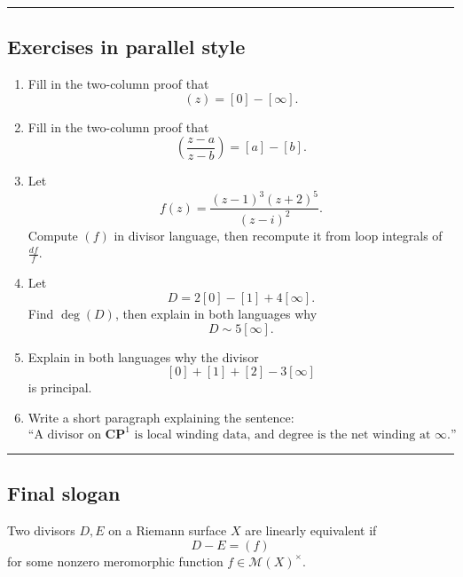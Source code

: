 \documentclass[11pt]{article}
\begin{document}
	\bigskip
	\hrule
	\bigskip
	
	\subsection*{Exercises in parallel style}
	
	\begin{enumerate}
		\item Fill in the two-column proof that
		\[
		(z)=[0]-[\infty].
		\]
		
		\item Fill in the two-column proof that
		\[
		\left(\frac{z-a}{z-b}\right)=[a]-[b].
		\]
		
		\item Let
		\[
		f(z)=\frac{(z-1)^3(z+2)^5}{(z-i)^2}.
		\]
		Compute \((f)\) in divisor language, then recompute it from loop integrals of \(\frac{df}{f}\).
		
		\item Let
		\[
		D=2[0]-[1]+4[\infty].
		\]
		Find \(\deg(D)\), then explain in both languages why
		\[
		D\sim 5[\infty].
		\]
		
		\item Explain in both languages why the divisor
		\[
		[0]+[1]+[2]-3[\infty]
		\]
		is principal.
		
		\item Write a short paragraph explaining the sentence:
		\[
		\text{``A divisor on }\mathbf{CP}^1\text{ is local winding data, and degree is the net winding at }\infty\text{.''}
		\]
	\end{enumerate}
	
	\bigskip
	\hrule
	\bigskip
	
	\subsection*{Final slogan}
	
	\begin{center}
	\end{center}

\newpage
Two divisors \(D,E\) on a Riemann surface \(X\) are linearly equivalent if
\[
D-E=(f)
\]
for some nonzero meromorphic function \(f\in \mathcal M(X)^\times\).
\end{document}
